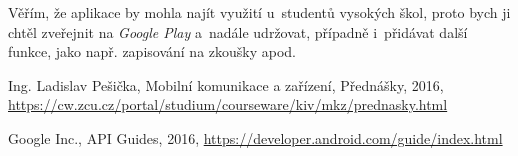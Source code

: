 \documentclass[12pt, a4paper]{article}
\begin{document}
	Věřím, že aplikace by mohla najít využití u~studentů vysokých škol, proto bych ji chtěl zveřejnit na \emph{Google Play} a~nadále udržovat, případně i~přidávat další funkce, jako např. zapisování na zkoušky apod.
	
	\newpage
	\begin{thebibliography}{9}
			Ing. Ladislav Pešička,
			Mobilní komunikace a zařízení,
			Přednášky,
			2016,
			\url{https://cw.zcu.cz/portal/studium/courseware/kiv/mkz/prednasky.html}
			
			Google Inc.,
			API Guides,
			2016,
			\url{https://developer.android.com/guide/index.html}
	\end{thebibliography}
	
\end{document}
